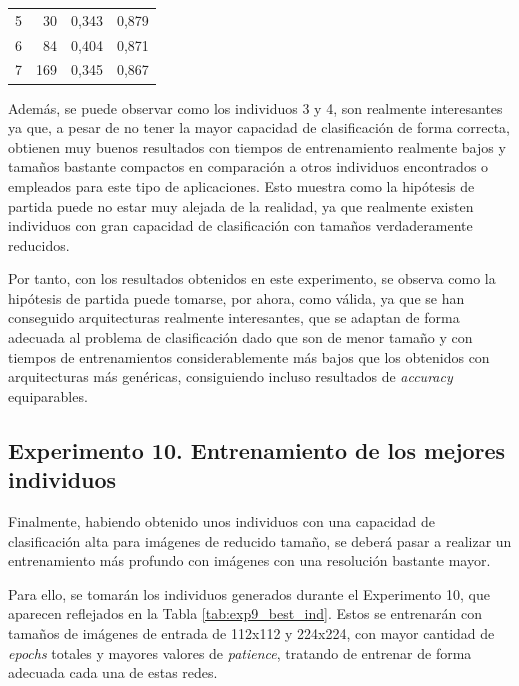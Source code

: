 \begin{table}[h]
\begin{tabular}{r|r|r|r}
5                                       & 30                                                                                            & 0,343                                       & 0,879                                          \\
6                                       & 84                                                                                            & 0,404                                       & 0,871                                          \\
7                                       & 169                                                                                           & 0,345                                       & 0,867      \\
\bottomrule
\end{tabular}
\end{table}

Además, se puede observar como los individuos 3 y 4, son realmente interesantes ya que, a pesar de no tener la mayor capacidad de clasificación de forma correcta, obtienen muy buenos resultados con tiempos de entrenamiento realmente bajos y tamaños bastante compactos en comparación a otros individuos encontrados o empleados para este tipo de aplicaciones. Esto muestra como la hipótesis de partida puede no estar muy alejada de la realidad, ya que realmente existen individuos con gran capacidad de clasificación con tamaños verdaderamente reducidos.

Por tanto, con los resultados obtenidos en este experimento, se observa como la hipótesis de partida puede tomarse, por ahora, como válida, ya que se han conseguido arquitecturas realmente interesantes, que se adaptan de forma adecuada al problema de clasificación dado que son de menor tamaño y con tiempos de entrenamientos considerablemente más bajos que los obtenidos con arquitecturas más genéricas, consiguiendo incluso resultados de \textit{accuracy} equiparables.

\subsection{Experimento 10. Entrenamiento de los mejores individuos}

Finalmente, habiendo obtenido unos individuos con una capacidad de clasificación alta para imágenes de reducido tamaño, se deberá pasar a realizar un entrenamiento más profundo con imágenes con una resolución bastante mayor.

Para ello, se tomarán los individuos generados durante el Experimento 10, que aparecen reflejados en la Tabla \ref{tab:exp9_best_ind}. Estos se entrenarán con tamaños de imágenes de entrada de 112x112 y 224x224, con mayor cantidad de \textit{epochs} totales y mayores valores de \textit{patience}, tratando de entrenar de forma adecuada cada una de estas redes.


